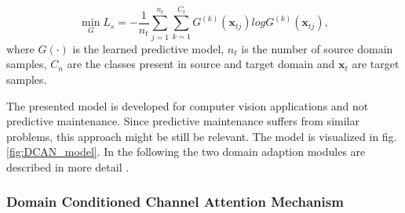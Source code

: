 \begin{equation}
    \min_{G} L_{s} = -\frac{1}{n_{t}} \sum_{j=1}^{n_{t}} \sum_{k=1}^{C_{t}} G^{(k)}(\pmb{x}_{tj})logG^{(k)}(\pmb{x}_{tj}),
\end{equation}
where $G(\cdot)$ is the learned predictive model, $n_{t}$ is the number of source domain samples, $C_{n}$ are the classes present in source and target domain and $\pmb{x}_{t}$ are target samples.

The presented model is developed for computer vision applications and not predictive maintenance. Since predictive maintenance suffers from similar problems, this approach might be still be relevant. The model is visualized in fig. \ref{fig:DCAN_model}. In the following the two domain adaption modules are described in more detail \cite{li2020}. 

\subsubsection{Domain Conditioned Channel Attention Mechanism}
